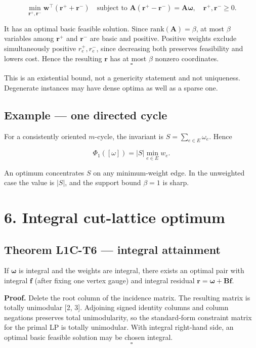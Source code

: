 \documentclass[
]{article}
\begin{document}
\[\min_{\mathbf{r}^+, \mathbf{r}^-} \mathbf{w}^\top (\mathbf{r}^+ + \mathbf{r}^-) \quad \text{subject to } \mathbf{A}(\mathbf{r}^+ - \mathbf{r}^-) = \mathbf{A}\boldsymbol{\omega}, \quad \mathbf{r}^+, \mathbf{r}^- \ge 0.\]

It has an optimal basic feasible solution. Since \(\text{rank}(\mathbf{A}) = \beta\), at most \(\beta\)
variables among \(\mathbf{r}^+\) and \(\mathbf{r}^-\) are basic and positive. Positive weights exclude
simultaneously positive \(r^+_e, r^-_e\), since decreasing both preserves feasibility
and lowers cost. Hence the resulting \(\mathbf{r}\) has at most \(\beta\) nonzero
coordinates. \[\square\]

This is an existential bound, not a genericity statement and not uniqueness.
Degenerate instances may have dense optima as well as a sparse one.

\subsection{Example --- one directed cycle}\label{example-one-directed-cycle}

For a consistently oriented \(m\)-cycle, the invariant is
\(S = \sum_{e \in E} \omega_e\). Hence

\[\Phi_1([\omega]) = |S| \min_{e \in E} w_e.\]

An optimum concentrates \(S\) on any minimum-weight edge. In the unweighted case
the value is \(|S|\), and the support bound \(\beta = 1\) is sharp.

\section{6. Integral cut-lattice optimum}\label{integral-cut-lattice-optimum}

\subsection{Theorem L1C-T6 --- integral attainment}\label{theorem-l1c-t6-integral-attainment}

If \(\boldsymbol{\omega}\) is integral and the weights are integral, there exists an optimal
pair with integral \(\mathbf{f}\) (after fixing one vertex gauge) and integral residual
\(\mathbf{r} = \boldsymbol{\omega} + \mathbf{B}\mathbf{f}\).

\textbf{Proof.} Delete the root column of the incidence matrix. The resulting matrix
is totally unimodular {[}2, 3{]}. Adjoining signed identity columns and column negations
preserves total unimodularity, so the standard-form constraint matrix for the
primal LP is totally unimodular. With integral right-hand side, an optimal basic
feasible solution may be chosen integral. \[\square\]
\end{document}
